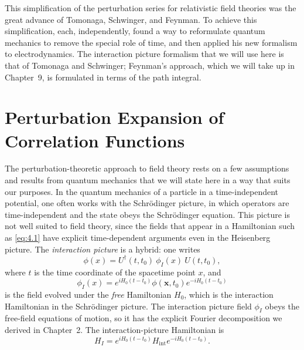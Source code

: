 This simplification of the perturbation series for relativistic field
theories was the great advance of Tomonaga, Schwinger, and Feynman.  To
achieve this simplification, each, independently, found a way to reformulate
quantum mechanics to remove the special role of time, and then applied his
new formalism to electrodynamics.  The interaction picture formalism that we
will use here is that of Tomonaga and Schwinger; Feynman's approach, which
we will take up in Chapter~9, is formulated in terms of the path integral.

\section{Perturbation Expansion of Correlation Functions}

The perturbation-theoretic approach to field theory rests on a few
assumptions and results from quantum mechanics that we will state here in a
way that suits our purposes.  In the quantum mechanics of a particle in a
time-independent potential, one often works with the Schr\"odinger picture,
in which operators are time-independent and the state obeys the Schr\"odinger
equation.  This picture is not well suited to field theory, since the fields
that appear in a Hamiltonian such as \eqref{eq:4.1} have explicit
time-dependent arguments even in the Heisenberg picture.  The
\emph{interaction picture} is a hybrid: one writes
\begin{equation}
  \phi(x) = U^{\dagger}(t,t_0)\ \phi_I(x)\ U(t,t_0),
  \label{eq:4.10}
\end{equation}
where $t$ is the time coordinate of the spacetime point $x$, and
\begin{equation}
  \phi_I(x) = e^{iH_0(t-t_0)}\phi(\mathbf{x},t_0)e^{-iH_0(t-t_0)}
\end{equation}
is the field evolved under the \emph{free} Hamiltonian $H_0$, which is the
interaction Hamiltonian in the Schr\"odinger picture.  The interaction
picture field $\phi_I$ obeys the free-field equations of motion, so it has
the explicit Fourier decomposition we derived in Chapter~2.  The
interaction-picture Hamiltonian is
\begin{equation}
  H_I = e^{iH_0(t-t_0)}H_{\mathrm{int}}e^{-iH_0(t-t_0)} .
  \label{eq:4.11}
\end{equation}

